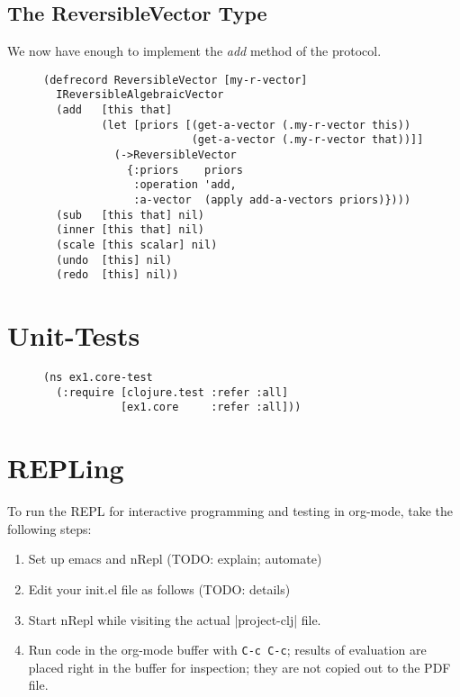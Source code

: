 \documentclass[11pt]{article}
\begin{document}
\subsection{The ReversibleVector Type}
\label{sec-4-6}

We now have enough to implement the \emph{add} method of the protocol.

\begin{figure}[H]
\label{reversible-algebraic-vector-on-vector}
\begin{verbatim}
(defrecord ReversibleVector [my-r-vector]
  IReversibleAlgebraicVector
  (add   [this that]
         (let [priors [(get-a-vector (.my-r-vector this))
                       (get-a-vector (.my-r-vector that))]]
           (->ReversibleVector
             {:priors    priors
              :operation 'add,
              :a-vector  (apply add-a-vectors priors)})))
  (sub   [this that] nil)
  (inner [this that] nil)
  (scale [this scalar] nil)
  (undo  [this] nil)
  (redo  [this] nil))
\end{verbatim}
\end{figure}
\section{Unit-Tests}
\label{sec-5}

\begin{figure}[H]
\label{test-namespace}
\begin{verbatim}
(ns ex1.core-test
  (:require [clojure.test :refer :all]
            [ex1.core     :refer :all]))
\end{verbatim}
\end{figure}
\section{REPLing}
\label{sec-6}
\label{sec:emacs-repl}
To run the REPL for interactive programming and testing in org-mode,
take the following steps:
\begin{enumerate}
\item Set up emacs and nRepl (TODO: explain; automate)
\item Edit your init.el file as follows (TODO: details)
\item Start nRepl while visiting the actual |project-clj| file.
\item Run code in the org-mode buffer with \verb|C-c C-c|; results of
evaluation are placed right in the buffer for inspection; they are
not copied out to the PDF file.
\end{enumerate}
\end{document}

